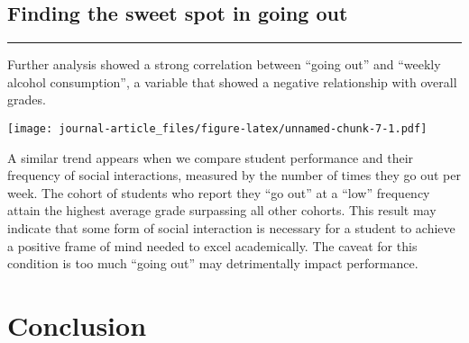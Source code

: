 \documentclass[
]{article}
\newenvironment{Shaded}{\begin{snugshade}}{\end{snugshade}}
\newcommand{\DataTypeTok}[1]{\textcolor[rgb]{0.13,0.29,0.53}{#1}}
\newcommand{\DecValTok}[1]{\textcolor[rgb]{0.00,0.00,0.81}{#1}}
\newcommand{\KeywordTok}[1]{\textcolor[rgb]{0.13,0.29,0.53}{\textbf{#1}}}
\newcommand{\NormalTok}[1]{#1}
\newcommand{\OperatorTok}[1]{\textcolor[rgb]{0.81,0.36,0.00}{\textbf{#1}}}
\newcommand{\StringTok}[1]{\textcolor[rgb]{0.31,0.60,0.02}{#1}}
\begin{document}
\hypertarget{finding-the-sweet-spot-in-going-out}{%
\subsection{Finding the sweet spot in going
out}\label{finding-the-sweet-spot-in-going-out}}

\begin{center}\rule{0.5\linewidth}{0.5pt}\end{center}

Further analysis showed a strong correlation between ``going out'' and
``weekly alcohol consumption'', a variable that showed a negative
relationship with overall grades.

\begin{Shaded}
\end{Shaded}

\texttt{[image: journal-article\_files/figure-latex/unnamed-chunk-7-1.pdf]}

A similar trend appears when we compare student performance and their
frequency of social interactions, measured by the number of times they
go out per week. The cohort of students who report they ``go out'' at a
``low'' frequency attain the highest average grade surpassing all other
cohorts. This result may indicate that some form of social interaction
is necessary for a student to achieve a positive frame of mind needed to
excel academically. The caveat for this condition is too much ``going
out'' may detrimentally impact performance.

\hypertarget{conclusion}{%
\section{Conclusion}\label{conclusion}}
\end{document}
